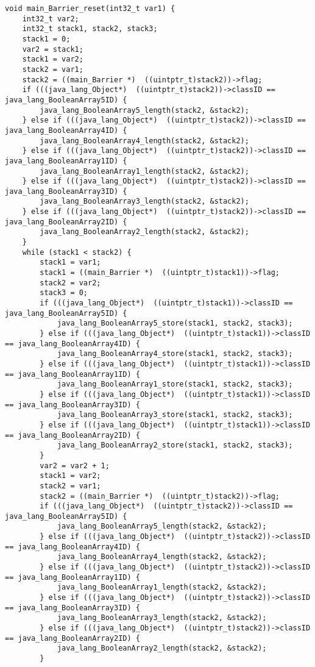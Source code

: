 \begin{landscape}
\begin{multicols}{2}
\begin{lstlisting}[firstnumber=2362]
void main_Barrier_reset(int32_t var1) {
	int32_t var2;
	int32_t stack1, stack2, stack3;
	stack1 = 0;
	var2 = stack1;
	stack1 = var2;
	stack2 = var1;
	stack2 = ((main_Barrier *)  ((uintptr_t)stack2))->flag;
	if (((java_lang_Object*)  ((uintptr_t)stack2))->classID == java_lang_BooleanArray5ID) {
		java_lang_BooleanArray5_length(stack2, &stack2);
	} else if (((java_lang_Object*)  ((uintptr_t)stack2))->classID == java_lang_BooleanArray4ID) {
		java_lang_BooleanArray4_length(stack2, &stack2);
	} else if (((java_lang_Object*)  ((uintptr_t)stack2))->classID == java_lang_BooleanArray1ID) {
		java_lang_BooleanArray1_length(stack2, &stack2);
	} else if (((java_lang_Object*)  ((uintptr_t)stack2))->classID == java_lang_BooleanArray3ID) {
		java_lang_BooleanArray3_length(stack2, &stack2);
	} else if (((java_lang_Object*)  ((uintptr_t)stack2))->classID == java_lang_BooleanArray2ID) {
		java_lang_BooleanArray2_length(stack2, &stack2);
	}
	while (stack1 < stack2) {
		stack1 = var1;
		stack1 = ((main_Barrier *)  ((uintptr_t)stack1))->flag;
		stack2 = var2;
		stack3 = 0;
		if (((java_lang_Object*)  ((uintptr_t)stack1))->classID == java_lang_BooleanArray5ID) {
			java_lang_BooleanArray5_store(stack1, stack2, stack3);
		} else if (((java_lang_Object*)  ((uintptr_t)stack1))->classID == java_lang_BooleanArray4ID) {
			java_lang_BooleanArray4_store(stack1, stack2, stack3);
		} else if (((java_lang_Object*)  ((uintptr_t)stack1))->classID == java_lang_BooleanArray1ID) {
			java_lang_BooleanArray1_store(stack1, stack2, stack3);
		} else if (((java_lang_Object*)  ((uintptr_t)stack1))->classID == java_lang_BooleanArray3ID) {
			java_lang_BooleanArray3_store(stack1, stack2, stack3);
		} else if (((java_lang_Object*)  ((uintptr_t)stack1))->classID == java_lang_BooleanArray2ID) {
			java_lang_BooleanArray2_store(stack1, stack2, stack3);
		}
		var2 = var2 + 1;
		stack1 = var2;
		stack2 = var1;
		stack2 = ((main_Barrier *)  ((uintptr_t)stack2))->flag;
		if (((java_lang_Object*)  ((uintptr_t)stack2))->classID == java_lang_BooleanArray5ID) {
			java_lang_BooleanArray5_length(stack2, &stack2);
		} else if (((java_lang_Object*)  ((uintptr_t)stack2))->classID == java_lang_BooleanArray4ID) {
			java_lang_BooleanArray4_length(stack2, &stack2);
		} else if (((java_lang_Object*)  ((uintptr_t)stack2))->classID == java_lang_BooleanArray1ID) {
			java_lang_BooleanArray1_length(stack2, &stack2);
		} else if (((java_lang_Object*)  ((uintptr_t)stack2))->classID == java_lang_BooleanArray3ID) {
			java_lang_BooleanArray3_length(stack2, &stack2);
		} else if (((java_lang_Object*)  ((uintptr_t)stack2))->classID == java_lang_BooleanArray2ID) {
			java_lang_BooleanArray2_length(stack2, &stack2);
		}


\end{lstlisting}
\end{multicols}
\end{landscape}
